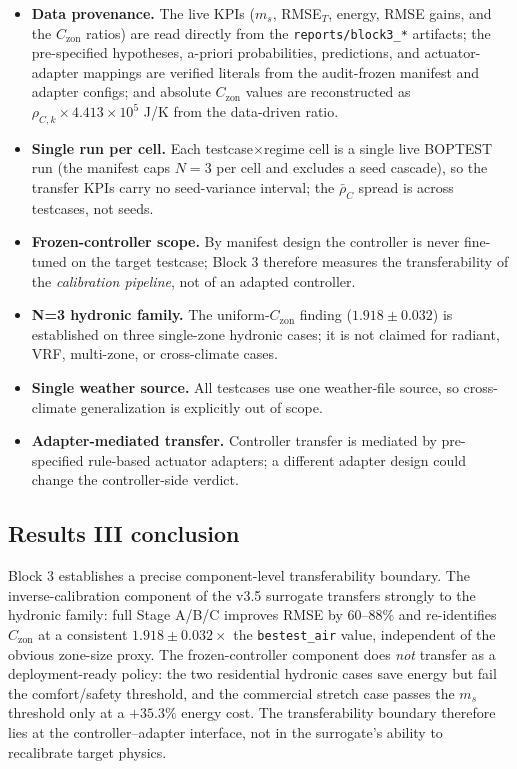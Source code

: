 \documentclass[11pt,a4paper]{article}
\begin{document}
\begin{itemize}
  \item \textbf{Data provenance.} The live KPIs ($m_s$, RMSE$_T$, energy, RMSE gains, and the $C_{\mathrm{zon}}$ ratios) are read directly from the \texttt{reports/block3\_*} artifacts; the pre-specified hypotheses, a-priori probabilities, predictions, and actuator-adapter mappings are verified literals from the audit-frozen manifest and adapter configs; and absolute $C_{\mathrm{zon}}$ values are reconstructed as $\rho_{C,k}\times 4.413\times10^5$ J/K from the data-driven ratio.
  \item \textbf{Single run per cell.} Each testcase$\times$regime cell is a single live BOPTEST run (the manifest caps $N=3$ per cell and excludes a seed cascade), so the transfer KPIs carry no seed-variance interval; the $\bar\rho_C$ spread is across testcases, not seeds.
  \item \textbf{Frozen-controller scope.} By manifest design the controller is never fine-tuned on the target testcase; Block 3 therefore measures the transferability of the \emph{calibration pipeline}, not of an adapted controller.
  \item \textbf{N=3 hydronic family.} The uniform-$C_{\mathrm{zon}}$ finding ($1.918\pm0.032$) is established on three single-zone hydronic cases; it is not claimed for radiant, VRF, multi-zone, or cross-climate cases.
  \item \textbf{Single weather source.} All testcases use one weather-file source, so cross-climate generalization is explicitly out of scope.
  \item \textbf{Adapter-mediated transfer.} Controller transfer is mediated by pre-specified rule-based actuator adapters; a different adapter design could change the controller-side verdict.
\end{itemize}

\subsection{Results III conclusion}

Block 3 establishes a precise component-level transferability boundary. The inverse-calibration component of the v3.5 surrogate transfers strongly to the hydronic family: full Stage A/B/C improves RMSE by $60$--$88\%$ and re-identifies $C_{\mathrm{zon}}$ at a consistent $1.918\pm0.032\times$ the \texttt{bestest\_air} value, independent of the obvious zone-size proxy. The frozen-controller component does \emph{not} transfer as a deployment-ready policy: the two residential hydronic cases save energy but fail the comfort/safety threshold, and the commercial stretch case passes the $m_s$ threshold only at a $+35.3\%$ energy cost. The transferability boundary therefore lies at the controller--adapter interface, not in the surrogate's ability to recalibrate target physics.
\end{document}
